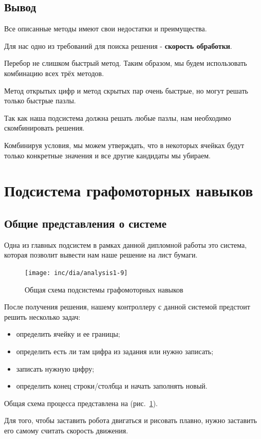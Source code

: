 \subsection{Вывод}
Все описанные методы имеют свои недостатки и преимущества.

Для нас одно из требований для поиска решения - \textbf{скорость обработки}. 

Перебор не слишком быстрый метод. Таким образом, мы будем использовать комбинацию всех трёх методов.

Метод открытых цифр и метод скрытых пар очень быстрые, но могут решать только быстрые пазлы. 

Так как наша подсистема должна решать любые пазлы, нам необходимо скомбинировать решения.

Комбинируя  условия, мы можем утверждать, что в некоторых ячейках  будут только конкретные значения и все другие кандидаты мы убираем.

\section{Подсистема графомоторных навыков}
\subsection{Общие представления о системе}
Одна из главных подсистем в рамках данной дипломной работы это система, которая позволит вывести нам наше решение на лист бумаги. 

\begin{figure}[ht]
	\centering
	\texttt{[image: inc/dia/analysis1-9]}
	\caption{Общая схема подсистемы графомоторных навыков}
  \label{fig:fig09}
\end{figure}

После получения решения, нашему контроллеру с данной системой предстоит решить несколько задач:
\begin{itemize}
 \item определить ячейку и ее границы;
 \item определить есть ли там цифра из задания или нужно записать;
 \item записать нужную цифру;
 \item определить конец строки/столбца и начать заполнять новый.
\end{itemize}


Общая схема процесса представлена на (рис.~\ref{fig:fig09}).

Для того, чтобы заставить робота двигаться и рисовать плавно, нужно заставить его самому считать скорость движения.

